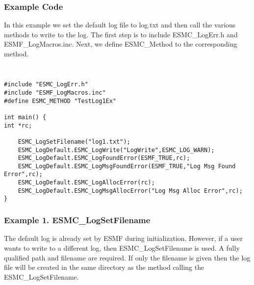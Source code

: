 %


\subsubsection{Example Code}

In this example we set the default log file to log.txt and then call the 
various methods to write to the log.  The first step is to include 
ESMC\_LogErr.h and ESMF\_LogMacros.inc.  Next, we define ESMC\_Method to 
the corresponding method.

{\tt
\begin{verbatim}
#include "ESMC_LogErr.h"
#include "ESMF_LogMacros.inc"
#define ESMC_METHOD "TestLog1Ex"

int main() {
int *rc;
    
    ESMC_LogSetFilename("log1.txt");
    ESMC_LogDefault.ESMC_LogWrite("LogWrite",ESMC_LOG_WARN);
    ESMC_LogDefault.ESMC_LogFoundError(ESMF_TRUE,rc);
	ESMC_LogDefault.ESMC_LogMsgFoundError(ESMF_TRUE,"Log Msg Found Error",rc);
    ESMC_LogDefault.ESMC_LogAllocError(rc);
	ESMC_LogDefault.ESMC_LogMsgAllocError("Log Msg Alloc Error",rc);
}
\end{verbatim}
\tt}

\subsubsection{Example 1. ESMC\_LogSetFilename}

The default log is already set by ESMF during initialization.  However, if a user
wants to write to a different log, then ESMC\_LogSetFilename is used.  A fully 
qualified path and filename are required.  If only the filename is given then
the log file will be created in the same directory as the method calling the
ESMC\_LogSetFilename.

